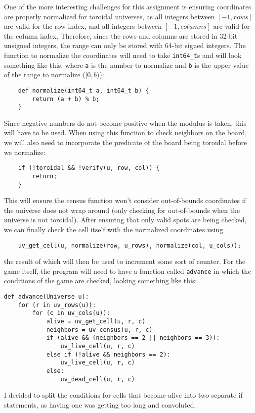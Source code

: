 \documentclass[12pt]{article}
\begin{document}
One of the more interesting challenges for this assignment is ensuring coordinates are properly normalized for toroidal universes, as all integers between $[-1, rows]$ are valid for the row index, and all integers between $[-1, columns]$ are valid for the column index. Therefore, since the rows and columns are stored in 32-bit unsigned integers, the range can only be stored with 64-bit signed integers. The function to normalize the coordinates will need to take \verb|int64_t|s and will look something like this, where \verb|a| is the number to normalize and \verb|b| is the upper value of the range to normalize ($[0, b)$):
\begin{verbatim}
    def normalize(int64_t a, int64_t b) {
        return (a + b) % b;
    }
\end{verbatim}
Since negative numbers do not become positive when the modulus is taken, this will have to be used. When using this function to check neighbors on the board, we will also need to incorporate the predicate of the board being toroidal before we normalize:
\begin{verbatim}
    if (!toroidal && !verify(u, row, col)) {
        return;
    }
\end{verbatim}
This will ensure the census function won't consider out-of-bounds coordinates if the universe does not wrap around (only checking for out-of-bounds when the universe is not toroidal). After ensuring that only valid spots are being checked, we can finally check the cell itself with the normalized coordinates using
\begin{verbatim}
    uv_get_cell(u, normalize(row, u_rows), normalize(col, u_cols));
\end{verbatim}
the result of which will then be used to increment some sort of counter. For the game itself, the program will need to have a function called \verb|advance| in which the conditions of the game are checked, looking something like this:
\begin{verbatim}
def advance(Universe u):
    for (r in uv_rows(u)):
        for (c in uv_cols(u)):
            alive = uv_get_cell(u, r, c)
            neighbors = uv_census(u, r, c)
            if (alive && (neighbors == 2 || neighbors == 3)):
                uv_live_cell(u, r, c)
            else if (!alive && neighbors == 2):
                uv_live_cell(u, r, c)
            else:
                uv_dead_cell(u, r, c)
\end{verbatim}
I decided to split the conditions for cells that become alive into two separate if statements, as having one was getting too long and convoluted.
\end{document}
